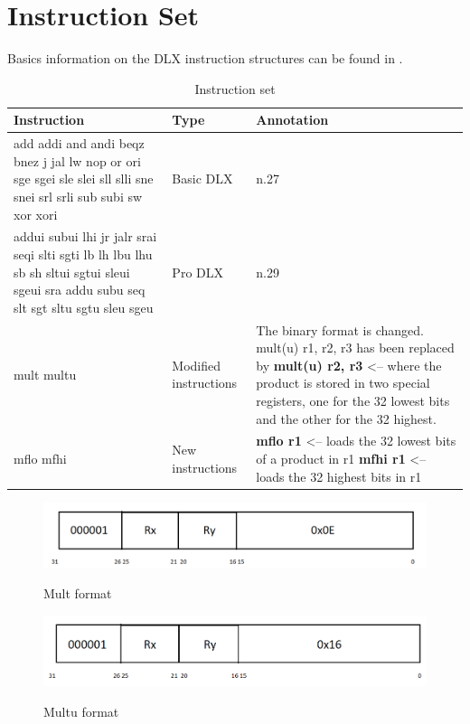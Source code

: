 \section{Instruction Set}

Basics information on the DLX instruction structures can be found in \cite{ProjectSpecification}.

\begin{table}[H]
\centering
\begin{tabular}{|p{}|p{}|p{}|}
\hline
\textbf{Instruction}&\textbf{Type}&\textbf{Annotation}\\ \hline
add addi and andi beqz bnez j jal lw nop or ori sge sgei sle slei sll slli sne snei srl srli sub subi sw xor xori & Basic DLX & n.27 \\ \hline
addui subui lhi jr jalr srai seqi slti sgti lb lh lbu lhu sb sh sltui sgtui sleui sgeui sra addu subu seq slt sgt sltu sgtu sleu sgeu & Pro DLX & n.29 \\ \hline
mult multu & Modified instructions & The binary format is changed. \newline mult(u) r1, r2, r3 has been replaced by \newline \textbf{mult(u) r2, r3}  <-- where the product is stored in two special registers, one for the 32 lowest bits and the other for the 32 highest. \\ \hline
mflo mfhi & New instructions & \textbf{mflo r1} <-- loads the 32 lowest bits of a product in r1 \newline \textbf{mfhi r1} <-- loads the 32 highest bits in r1\\
\hline
\end{tabular}
\caption{Instruction set}
\end{table}

\begin{figure}[H]
\centering
\includegraphics[scale=.6]{Immagini/01}
\label{01}
\caption{Mult format}
\end{figure}
\begin{figure}[H]
\centering
\includegraphics[scale=.6]{Immagini/02}
\label{02}
\caption{Multu format}
\end{figure}

